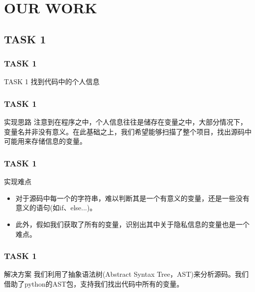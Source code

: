 \documentclass[10pt]{ctexbeamer}
\begin{document}
    \section{OUR WORK}
    \subsection{TASK 1}
    \begin{frame}
        \frametitle{TASK 1}
    
        \begin{block}{TASK 1}
            找到代码中的个人信息
        \end{block}
    
    \end{frame}

    \begin{frame}
        \frametitle{TASK 1}
    
        \begin{block}{实现思路}
            注意到在程序之中，个人信息往往是储存在变量之中，大部分情况下，变量名并非没有意义。在此基础之上，我们希望能够扫描了整个项目，找出源码中可能用来存储信息的变量。
        \end{block}
    \end{frame}

    \begin{frame}
        \frametitle{TASK 1}
    
        \begin{block}{实现难点}
            \begin{itemize}
                \item 对于源码中每一个的字符串，难以判断其是一个有意义的变量，还是一些没有意义的语句(如if、else...)。

                \item 此外，假如我们获取了所有的变量，识别出其中关于隐私信息的变量也是一个难点。
            \end{itemize}
        \end{block}
    \end{frame}

    \begin{frame}
        \frametitle{TASK 1}
        \begin{block}{解决方案}
            我们利用了抽象语法树(Abstract Syntax Tree，AST)来分析源码。我们借助了python的AST包，支持我们找出代码中所有的变量。
        \end{block}
    \end{frame}
\end{document}
